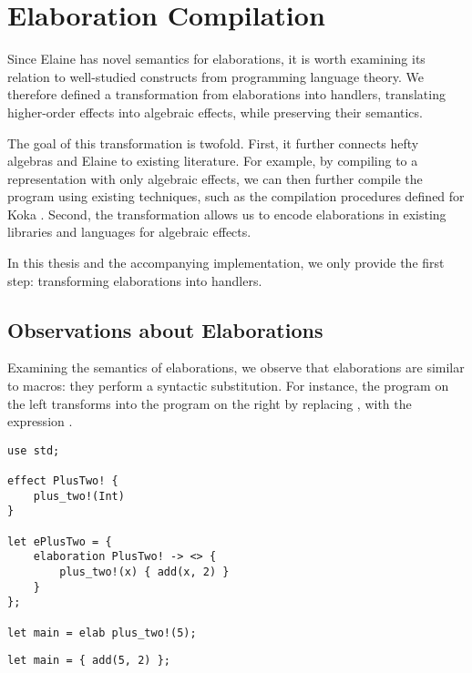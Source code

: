 \chapter{Elaboration Compilation}\label{chap:elabcomp}

Since Elaine has novel semantics for elaborations, it is worth examining its relation to well-studied constructs from programming language theory. We therefore defined a transformation from elaborations into handlers, translating higher-order effects into algebraic effects, while preserving their semantics.

The goal of this transformation is twofold. First, it further connects hefty algebras and Elaine to existing literature. For example, by compiling to a representation with only algebraic effects, we can then further compile the program using existing techniques, such as the compilation procedures defined for Koka \autocite{leijen_type_2017}. Second, the transformation allows us to encode elaborations in existing libraries and languages for algebraic effects.

In this thesis and the accompanying implementation, we only provide the first step: transforming elaborations into handlers.

\section{Observations about Elaborations}

Examining the semantics of elaborations, we observe that elaborations are similar to macros: they perform a syntactic substitution. For instance, the program on the left transforms into the program on the right by replacing , with the expression .

\begin{minipage}[b]{0.5\textwidth}
\begin{lstlisting}[language=elaine,style=fancy]
use std;

effect PlusTwo! {
    plus_two!(Int)
}

let ePlusTwo = {
    elaboration PlusTwo! -> <> {
        plus_two!(x) { add(x, 2) }
    }
};

let main = elab plus_two!(5);
\end{lstlisting}
\end{minipage}
\begin{minipage}[b]{0.5\textwidth}
\begin{lstlisting}[language=elaine,style=fancy]
let main = { add(5, 2) };
\end{lstlisting}
\end{minipage}

